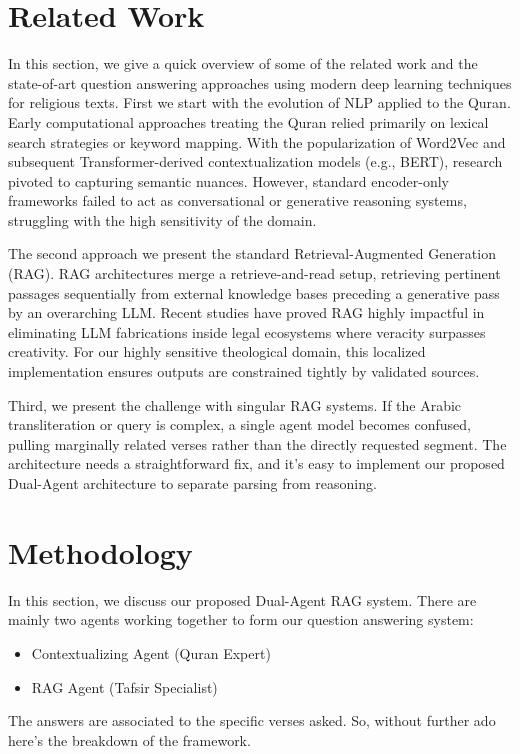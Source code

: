 \documentclass[conference]{IEEEtran}
\begin{document}
\section{Related Work}
In this section, we give a quick overview of some of the related work and the state-of-art question answering approaches using modern deep learning techniques for religious texts. First we start with the evolution of NLP applied to the Quran. Early computational approaches treating the Quran relied primarily on lexical search strategies or keyword mapping. With the popularization of Word2Vec and subsequent Transformer-derived contextualization models (e.g., BERT), research pivoted to capturing semantic nuances. However, standard encoder-only frameworks failed to act as conversational or generative reasoning systems, struggling with the high sensitivity of the domain.

The second approach we present the standard Retrieval-Augmented Generation (RAG). RAG architectures merge a retrieve-and-read setup, retrieving pertinent passages sequentially from external knowledge bases preceding a generative pass by an overarching LLM. Recent studies have proved RAG highly impactful in eliminating LLM fabrications inside legal ecosystems where veracity surpasses creativity. For our highly sensitive theological domain, this localized implementation ensures outputs are constrained tightly by validated sources.

Third, we present the challenge with singular RAG systems. If the Arabic transliteration or query is complex, a single agent model becomes confused, pulling marginally related verses rather than the directly requested segment. The architecture needs a straightforward fix, and it’s easy to implement our proposed Dual-Agent architecture to separate parsing from reasoning.

\section{Methodology}
In this section, we discuss our proposed Dual-Agent RAG system. There are mainly two agents working together to form our question answering system:

\begin{itemize}
  \item	Contextualizing Agent (Quran Expert)
  \item RAG Agent (Tafsir Specialist)
\end{itemize}

The answers are associated to the specific verses asked. So, without further ado here’s the breakdown of the framework.
\end{document}
